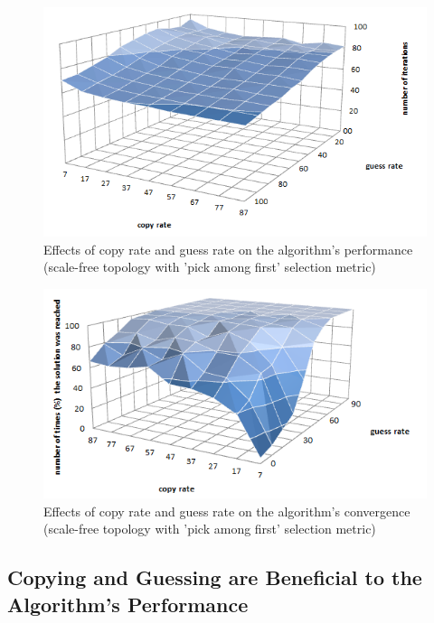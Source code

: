 \documentclass{article}
\begin{document}
\begin{figure}
\includegraphics[scale=0.60]{copy_guess_free_prob}
\caption{Effects of copy rate and guess rate on the algorithm's performance (scale-free topology with 'pick among first' selection metric)
}
\label{fig:copy_guess_free_prob}
\end{figure}

\begin{figure}
\includegraphics[scale=0.60]{copy_guess_free_prob_num_solution_reached}
\caption{Effects of copy rate and guess rate on the algorithm's convergence (scale-free topology with 'pick among first' selection metric)
}
\label{fig:copy_guess_free_prob_num_solution_reached}
\end{figure}

\subsection{Copying and Guessing are Beneficial to the Algorithm's Performance}
\end{document}
